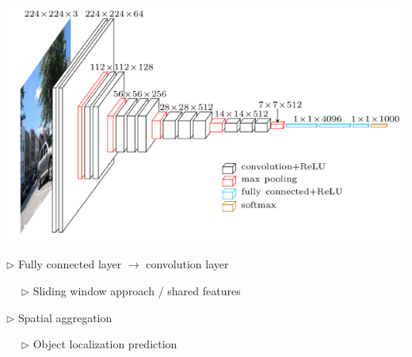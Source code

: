 \documentclass[landscape,a0paper,fontscale=0.292]{baposter}
\begin{document}
\begin{poster}
{\begin{center}
\includegraphics[width=14cm]{../slides/images/vgg16.png}
\end{center}

\vspace{-3mm}
\begin{minipage}[t]{8cm}

$\triangleright$ Fully connected layer $\rightarrow$ convolution layer 

~~ $\triangleright$ Sliding window approach / shared features

\end{minipage} \hfill 
\begin{minipage}[t]{8cm}

$\triangleright$ Spatial aggregation 

~~ $\triangleright$ Object localization prediction

\end{minipage}

}

\end{poster}
\end{document}
